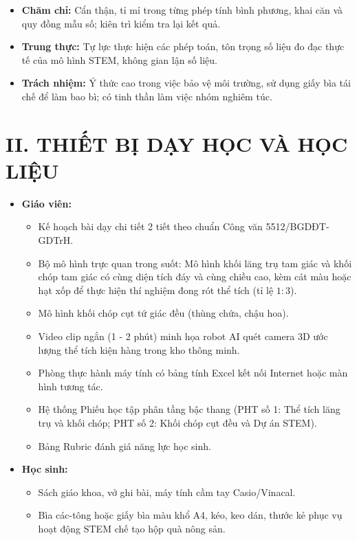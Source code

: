 \documentclass[12pt, a4paper]{article}
\begin{document}
\begin{itemize}[leftmargin=1.2cm]
    \item \textbf{Chăm chỉ:} Cẩn thận, tỉ mỉ trong từng phép tính bình phương, khai căn và quy đồng mẫu số; kiên trì kiểm tra lại kết quả.
    \item \textbf{Trung thực:} Tự lực thực hiện các phép toán, tôn trọng số liệu đo đạc thực tế của mô hình STEM, không gian lận số liệu.
    \item \textbf{Trách nhiệm:} Ý thức cao trong việc bảo vệ môi trường, sử dụng giấy bìa tái chế để làm bao bì; có tinh thần làm việc nhóm nghiêm túc.
\end{itemize}

\section*{II. THIẾT BỊ DẠY HỌC VÀ HỌC LIỆU}

\begin{itemize}[leftmargin=1.2cm]
    \item \textbf{Giáo viên:}
    \begin{itemize}[leftmargin=0.6cm]
        \item Kế hoạch bài dạy chi tiết 2 tiết theo chuẩn Công văn 5512/BGDĐT-GDTrH.
        \item Bộ mô hình trực quan trong suốt: Mô hình khối lăng trụ tam giác và khối chóp tam giác có cùng diện tích đáy và cùng chiều cao, kèm cát màu hoặc hạt xốp để thực hiện thí nghiệm đong rót thể tích (tỉ lệ $1:3$).
        \item Mô hình khối chóp cụt tứ giác đều (thùng chứa, chậu hoa).
        \item Video clip ngắn (1 - 2 phút) minh họa robot AI quét camera 3D ước lượng thể tích kiện hàng trong kho thông minh.
        \item Phòng thực hành máy tính có bảng tính Excel kết nối Internet hoặc màn hình tương tác.
        \item Hệ thống Phiếu học tập phân tầng bậc thang (PHT số 1: Thể tích lăng trụ và khối chóp; PHT số 2: Khối chóp cụt đều và Dự án STEM).
        \item Bảng Rubric đánh giá năng lực học sinh.
    \end{itemize}

    \item \textbf{Học sinh:}
    \begin{itemize}[leftmargin=0.6cm]
        \item Sách giáo khoa, vở ghi bài, máy tính cầm tay Casio/Vinacal.
        \item Bìa các-tông hoặc giấy bìa màu khổ A4, kéo, keo dán, thước kẻ phục vụ hoạt động STEM chế tạo hộp quà nông sản.
    \end{itemize}
\end{itemize}
\end{document}
